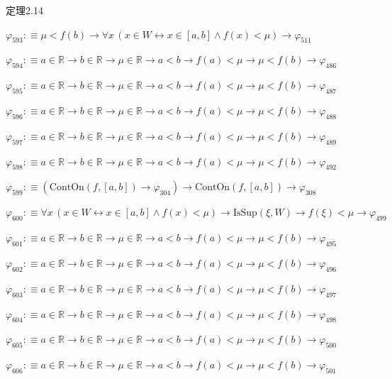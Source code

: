 \begin{fullproof}{定理2.14}
\begin{abbrevlist}
\item $\varphi_{593} :\equiv \mu < f(b) \to \forall x\,(x \in W \leftrightarrow x \in [a,b] \land f(x) < \mu) \to \varphi_{511}$
\item $\varphi_{594} :\equiv a \in \mathbb{R} \to b \in \mathbb{R} \to \mu \in \mathbb{R} \to a < b \to f(a) < \mu \to \mu < f(b) \to \varphi_{486}$
\item $\varphi_{595} :\equiv a \in \mathbb{R} \to b \in \mathbb{R} \to \mu \in \mathbb{R} \to a < b \to f(a) < \mu \to \mu < f(b) \to \varphi_{487}$
\item $\varphi_{596} :\equiv a \in \mathbb{R} \to b \in \mathbb{R} \to \mu \in \mathbb{R} \to a < b \to f(a) < \mu \to \mu < f(b) \to \varphi_{488}$
\item $\varphi_{597} :\equiv a \in \mathbb{R} \to b \in \mathbb{R} \to \mu \in \mathbb{R} \to a < b \to f(a) < \mu \to \mu < f(b) \to \varphi_{489}$
\item $\varphi_{598} :\equiv a \in \mathbb{R} \to b \in \mathbb{R} \to \mu \in \mathbb{R} \to a < b \to f(a) < \mu \to \mu < f(b) \to \varphi_{492}$
\item $\varphi_{599} :\equiv (\mathrm{ContOn}(f,[a,b]) \to \varphi_{304}) \to \mathrm{ContOn}(f,[a,b]) \to \varphi_{308}$
\item $\varphi_{600} :\equiv \forall x\,(x \in W \leftrightarrow x \in [a,b] \land f(x) < \mu) \to \mathrm{IsSup}(\xi,W) \to f(\xi) < \mu \to \varphi_{499}$
\item $\varphi_{601} :\equiv a \in \mathbb{R} \to b \in \mathbb{R} \to \mu \in \mathbb{R} \to a < b \to f(a) < \mu \to \mu < f(b) \to \varphi_{495}$
\item $\varphi_{602} :\equiv a \in \mathbb{R} \to b \in \mathbb{R} \to \mu \in \mathbb{R} \to a < b \to f(a) < \mu \to \mu < f(b) \to \varphi_{496}$
\item $\varphi_{603} :\equiv a \in \mathbb{R} \to b \in \mathbb{R} \to \mu \in \mathbb{R} \to a < b \to f(a) < \mu \to \mu < f(b) \to \varphi_{497}$
\item $\varphi_{604} :\equiv a \in \mathbb{R} \to b \in \mathbb{R} \to \mu \in \mathbb{R} \to a < b \to f(a) < \mu \to \mu < f(b) \to \varphi_{498}$
\item $\varphi_{605} :\equiv a \in \mathbb{R} \to b \in \mathbb{R} \to \mu \in \mathbb{R} \to a < b \to f(a) < \mu \to \mu < f(b) \to \varphi_{500}$
\item $\varphi_{606} :\equiv a \in \mathbb{R} \to b \in \mathbb{R} \to \mu \in \mathbb{R} \to a < b \to f(a) < \mu \to \mu < f(b) \to \varphi_{501}$

\end{abbrevlist}
\end{fullproof}
